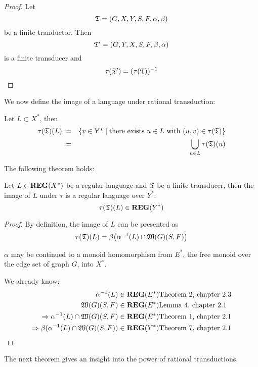 \begin{proof}
Let \[ \mbox{$\mathfrak{T}$} = (G, X, Y, S, F, \alpha, \beta) \] be a finite tranductor.
Then \[ \mbox{$\mathfrak{T'}$} = (G, Y, X, S, F, \beta, \alpha) \] is a finite transducer and
\[ \tau(\mbox{$\mathfrak{T'}$}) = (\tau(\mbox{$\mathfrak{T}$}))^{-1} \]
\end{proof}

We now define the image of a language under rational transduction:

\begin{definition}
Let $L \subset X^*$, then
\begin{eqnarray*}
\tau(\mbox{$\mathfrak{T}$})(L) & := & \mbox{$\{v \in Y^* \mid \mbox{there exists } u \in L \mbox{
with } (u, v) \in \tau(\mbox{$\mathfrak{T}$})\}$} \\
& := & \bigcup_{u \in L} \tau(\mbox{$\mathfrak{T}$})(u)
\end{eqnarray*}
\end{definition}

The following theorem holds:

\begin{theorem}
Let $L \in \mbox{{\bf REG}}(X^*)$ be a regular language and $\mbox{$\mathfrak{T}$}$ be a finite transducer,
then the image of $L$ under $\tau$ is a regular language over $Y^*$:
\[ \tau(\mbox{$\mathfrak{T}$})(L) \in \mbox{{\bf REG}}(Y^*) \]
\end{theorem}

\begin{proof}
By definition, the image of $L$ can be presented as
\[ \tau(\mbox{$\mathfrak{T}$})(L) = \beta\big( \alpha^{-1}(L) \cap \mbox{$\mathfrak{W}({G})$}(S, F) \big) \]

$\alpha$ may be continued to a monoid homomorphism from $E^*$, the free monoid
over the edge set of graph $G$, into $X^*$.

We already know:
\begin{eqnarray*}
\alpha^{-1}(L) \in \mbox{{\bf REG}}(E^*)    & \mbox{Theorem 2, chapter 2.3} \\
\mbox{$\mathfrak{W}({G})$}(S, F) \in \mbox{{\bf REG}}(E^*) & \mbox{Lemma 4, chapter 2.1} \\
\Rightarrow \alpha^{-1}(L) \cap \mbox{$\mathfrak{W}({G})$}(S, F) \in
\mbox{{\bf REG}}(E^*) & \mbox{Theorem 1, chapter 2.1} \\
\Rightarrow \beta(\alpha^{-1}(L) \cap \mbox{$\mathfrak{W}({G})$}(S, F)) \in
\mbox{{\bf REG}}(Y^*) & \mbox{Theorem 7, chapter 2.1}
\end{eqnarray*}
\end{proof}

The next theorem gives an insight into the power of rational transductions.

